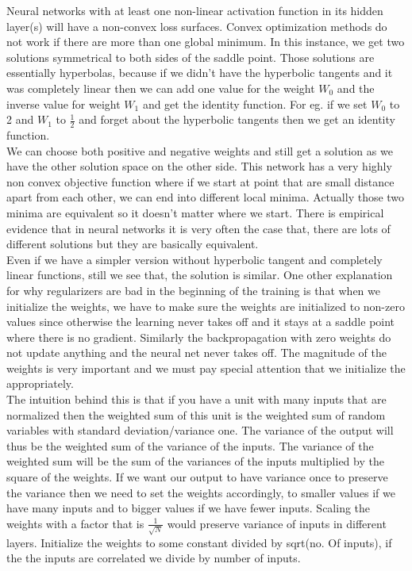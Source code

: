 Neural networks with at least one non-linear activation function in its hidden layer(s) will have a non-convex loss surfaces. 
Convex optimization methods do not work if there are more than one global minimum. 
In this instance, we get two solutions symmetrical to both sides of the saddle point. 
Those solutions are essentially hyperbolas, because if we didn't have the hyperbolic tangents and it was completely linear then we can add one value for the weight $W_0$ and the inverse value for weight $W_1$ and get the identity function. 
For eg. if we set $W_0$ to 2 and $W_1$ to $\frac{1}{2}$ and forget about the hyperbolic tangents then we get an identity function.\\

We can choose both positive and negative weights and still get a solution as we have the other solution space on the other side. 
This network has a very highly non convex objective function where if we start at point that are small distance apart from each other, we can end into different local minima. 
Actually those two minima are equivalent so it doesn’t matter where we start. 
There is empirical evidence that in neural networks it is very often the case that, there are lots of different solutions but they are basically equivalent. \\

Even if we have a simpler version without hyperbolic tangent and completely linear functions, still we see that, the solution is similar. 
One other explanation for why regularizers are bad in the beginning of the training is that when we initialize the weights, we have to make sure the weights are initialized to non-zero values since otherwise the learning never takes off and it stays at a saddle point where there is no gradient.
Similarly the backpropagation with zero weights do not update anything and the neural net never takes off. 
The magnitude of the weights is very important and we must pay special attention that we initialize the appropriately.\\

The intuition behind this is that if you have a unit with many inputs that are normalized then the weighted sum of this unit is the weighted sum of random variables with standard deviation/variance one.
The variance of the output will thus be the weighted sum of the variance of the inputs. 
The variance of the weighted sum will be the sum of the variances of the inputs multiplied by the square of the weights. 
If we want our output to have variance once to preserve the variance then we need to set the weights accordingly, to smaller values if we have many inputs and to bigger values if we have fewer inputs.
Scaling the weights with a factor that is $\frac{1}{\sqrt{N}}$ would preserve variance of inputs in different layers. 
Initialize the weights to some constant divided by sqrt(no. Of inputs), if the the inputs are correlated we divide by number of inputs. 